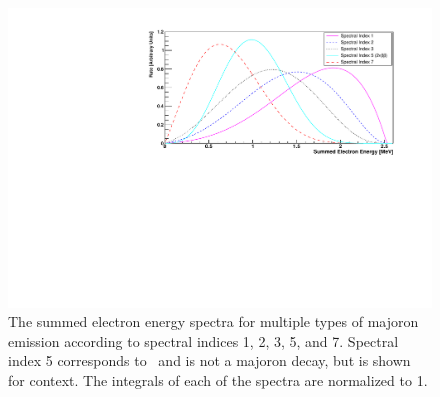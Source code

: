 \begin{figure}[htbp]
    \centering
    \includegraphics[width=0.9\linewidth]{Figures/EnergySpectrum_fixedFermi.pdf}
    \caption[The summed electron energy spectra for multiple types of majoron emission according to spectral indices 1, 2, 3, 5, and 7]
    {The summed electron energy spectra for multiple types of majoron emission according to spectral indices 1, 2, 3, 5, and 7.
    Spectral index 5 corresponds to \twonubb~and is not a majoron decay, but is shown for context.
    The integrals of each of the spectra are normalized to 1.}
    \label{fig:Majoron Spectrum}
\end{figure}


